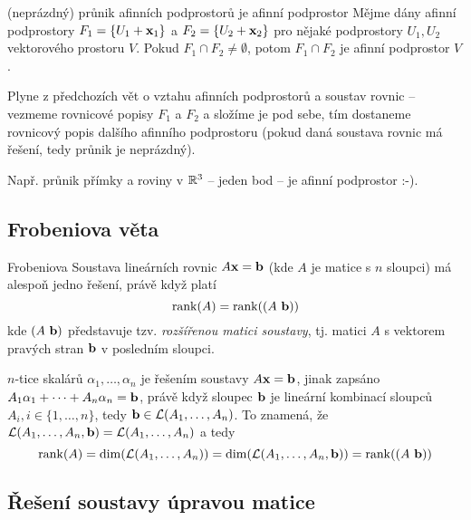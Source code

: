 \begin{vetaN}{(neprázdný) průnik afinních podprostorů je afinní podprostor}
Mějme dány afinní podprostory $F_1=\{U_1+\mathbf{x}_1\}$ a $F_2=\{U_2+\mathbf{x}_2\}$ pro nějaké podprostory $U_1,U_2$ vektorového prostoru $V$. Pokud $F_1\cap F_2\neq \emptyset$, potom $F_1\cap F_2$ je afinní podprostor $V$.

\begin{dukaz}
Plyne z předchozích vět o vztahu afinních podprostorů a soustav rovnic -- vezmeme rovnicové popisy $F_1$ a $F_2$ a složíme je pod sebe, tím dostaneme rovnicový popis dalšího afinního podprostoru (pokud daná soustava rovnic má řešení, tedy průnik je neprázdný).
\end{dukaz}

\begin{priklad}
Např. průnik přímky a roviny v $\mathbb{R}^3$ -- jeden bod -- je afinní podprostor :-).
\end{priklad}
\end{vetaN}


\subsection{Frobeniova věta }
 

\begin{vetaN}{Frobeniova}
Soustava lineárních rovnic $A\mathbf{x}=\mathbf{b}$ (kde $A$ je matice s $n$ sloupci) má alespoň jedno řešení, právě když platí
$$\mathrm{rank}(A)=\mathrm{rank}((A\ \mathbf{b}))$$
kde $(A\ \mathbf{b})$ představuje tzv. \emph{rozšířenou matici soustavy}, tj. matici $A$ s  vektorem pravých stran $\mathbf{b}$ v posledním sloupci.
\par\medskip
\begin{dukaz}
$n$-tice skalárů $\alpha_1,\dots,\alpha_n$ je řešením soustavy $A\mathbf{x}=\mathbf{b}$, jinak zapsáno $A_1\alpha_1+\dots+A_n\alpha_n=\mathbf{b}$, právě když sloupec $\mathbf{b}$ je lineární kombinací sloupců $A_i, i\in\{1,\dots,n\}$, tedy $\mathbf{b}\in\mathcal{L}(A_1,\dots,A_n)$. To znamená, že $\mathcal{L}(A_1,\dots,A_n,\mathbf{b})=\mathcal{L}(A_1,\dots,A_n)$ a tedy
$$\rank(A)=\dim(\Span(A_1,\dots,A_n))=\dim(\Span(A_1,\dots,A_n,\b{b}))=\rank((A\ \b{b}))$$
\end{dukaz}
\end{vetaN} 

\subsection{Řešení soustavy úpravou matice }

